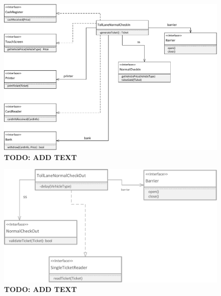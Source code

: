 \begin{figure}
\centerline{\includegraphics[width=\textwidth]{img/class_diagrams/class_diagram_toll_lane_normal_check_in}}
\caption{\textbf{TODO: ADD TEXT}}
\label{fig:cld_tlni}
\end{figure}

\begin{figure}
\centerline{\includegraphics[width=\textwidth]{img/class_diagrams/class_diagram_toll_lane_normal_check_out}}
\caption{\textbf{TODO: ADD TEXT}}
\label{fig:cld_tlno}
\end{figure}
